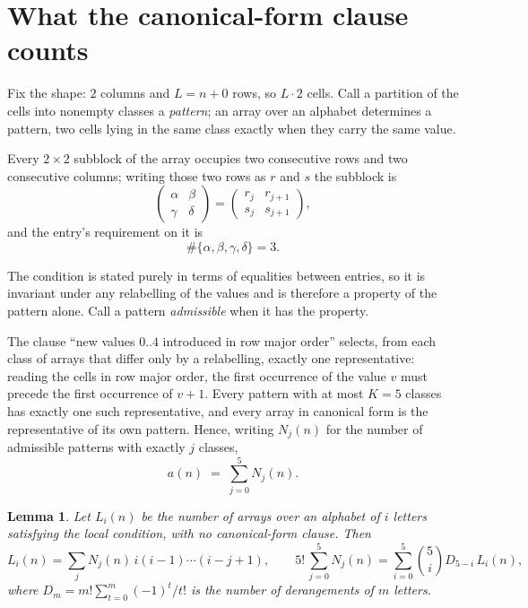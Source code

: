 \documentclass[11pt,a4paper]{article}
\theoremstyle{plain}
\newtheorem{lemma}[theorem]{Lemma}
\theoremstyle{definition}
\begin{document}
\section{What the canonical-form clause counts}

Fix the shape: $2$ columns and $L=n+0$ rows, so $L\cdot2$ cells. Call a
partition of the cells into nonempty classes a \emph{pattern}; an array over an alphabet
determines a pattern, two cells lying in the same class exactly when they carry the same
value.

Every $2\times2$ subblock of the array occupies two consecutive
rows and two consecutive columns; writing those two rows as $r$ and $s$ the
subblock is
\[
\begin{pmatrix}\alpha&\beta\\\gamma&\delta\end{pmatrix}=\begin{pmatrix}r_j&r_{j+1}\\s_j&s_{j+1}\end{pmatrix},
\]
and the entry's requirement on it is
\begin{equation}\label{eq:loc}
\#\{\alpha,\beta,\gamma,\delta\}=3.
\end{equation}

The condition is stated purely in terms of equalities between entries, so it is invariant
under any relabelling of the values and is therefore a property of the pattern alone. Call a
pattern \emph{admissible} when it has the property.

The clause ``new values $0..4$ introduced in row major order'' selects, from each class
of arrays that differ only by a relabelling, exactly one representative: reading the cells in
row major order, the first occurrence of the value $v$ must precede the first occurrence of
$v+1$. Every pattern with at most $K=5$ classes has exactly one such representative, and
every array in canonical form is the representative of its own pattern. Hence, writing
$N_j(n)$ for the number of admissible patterns with exactly $j$ classes,
\begin{equation}\label{eq:apat}
a(n)\;=\;\sum_{j=0}^{5}N_j(n).
\end{equation}

\begin{lemma}\label{lem:inv}
Let $L_i(n)$ be the number of arrays over an alphabet of $i$ letters satisfying the local
condition, with no canonical-form clause. Then
\[
L_i(n)=\sum_j N_j(n)\,i(i-1)\cdots(i-j+1),
\qquad
5!\,\sum_{j=0}^{5}N_j(n)=\sum_{i=0}^{5}\binom{5}{i}D_{5-i}\,L_i(n),
\]
where $D_m=m!\sum_{t=0}^{m}(-1)^t/t!$ is the number of derangements of $m$ letters.
\end{lemma}
\end{document}
